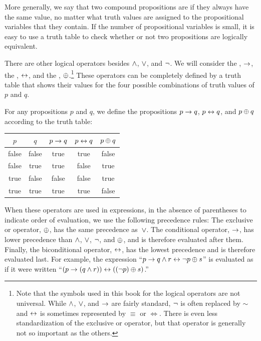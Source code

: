 More generally, we say that two compound propositions are
 if they always have the same value,
no matter what truth values are assigned to the propositional
variables that they contain.  If the number of propositional
variables is small, it is easy to use a truth table to check
whether or not two propositions are logically equivalent.

\medbreak

There are other logical operators besides $\wedge$, $\vee$, and
$\lnot$.  We will consider the , $\rightarrow$, the , $\leftrightarrow$,
and the , $\oplus$.\footnote{Note that the
symbols used in this book for the logical operators are not
universal.  While $\wedge$, $\vee$, and $\rightarrow$ are fairly standard,
$\lnot$ is often replaced by $\sim$ and $\leftrightarrow$ is sometimes represented
by $\equiv$ or $\Leftrightarrow$.  There is even less standardization
of the exclusive or operator, but that operator is generally not
so important as the others.}  These operators
can be completely defined by a truth table that shows their
values for the four possible combinations
of truth values of $p$ and $q$.

\begin{definition}
For any propositions $p$ and $q$, we define the propositions
$p\rightarrow q$, $p\leftrightarrow q$, and $p\oplus q$ according to the truth table:
   \begin{center}
     \begin{tabular}{|c|c||c|c|c|}
        \hline
        $p$& $q$& $p\rightarrow q$& $p\leftrightarrow q$& $p\oplus q$\\
        \hline
        \strut false&  false&  true&   true&   false\\
        false&  true&   true&   false&  true\\
        true&   false&  false&  false&  true\\
        true&   true&   true&   true&   false\\
        \hline
      \end{tabular}
   \end{center}
\end{definition}

When these operators are used in expressions, in the absence of parentheses
to indicate order of evaluation, we use the following precedence rules:
The exclusive or operator, $\oplus$, has the same precedence as~$\vee$.  The
conditional operator, $\rightarrow$, has lower precedence than
$\wedge$, $\vee$, $\lnot$, and $\oplus$, and is therefore evaluated after
them.  Finally, the biconditional operator, $\leftrightarrow$, has the lowest
precedence and is therefore evaluated last.  For example,
the expression ``$p\rightarrow q \wedge r \leftrightarrow \lnot p \oplus s$'' is evaluated
as if it were written ``$(p\rightarrow (q\wedge r))\leftrightarrow((\lnot p) \oplus s)$.''

